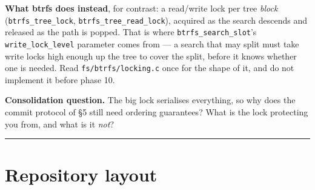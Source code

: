\textbf{What btrfs does instead}, for contrast: a read/write lock per tree \emph{block}
(\texttt{btrfs\_tree\_lock}, \texttt{btrfs\_tree\_read\_lock}), acquired as the search
descends and released as the path is popped. That is where
\texttt{btrfs\_search\_slot}'s \texttt{write\_lock\_level} parameter comes from --- a search
that may split must take write locks high enough up the tree to cover the split, before it
knows whether one is needed. Read \texttt{fs/btrfs/locking.c} once for the shape of it, and
do not implement it before phase 10.

\textbf{Consolidation question.} The big lock serialises everything, so why does the commit
protocol of §5 still need ordering guarantees? What is the lock protecting you from, and
what is it \emph{not}?

\begin{center}\rule{0.5\linewidth}{0.5pt}\end{center}

\hypertarget{repository-layout}{%
\section{Repository layout}\label{repository-layout}}

